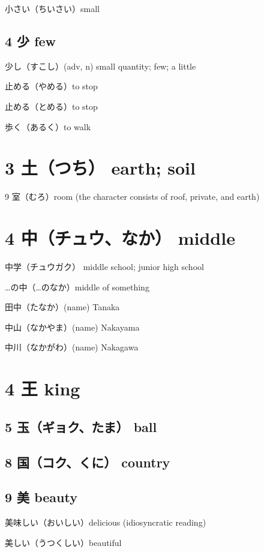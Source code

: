 小さい（ちいさい）small

\subsection{4 少 few}

少し（すこし）(adv, n) small quantity; few; a little

止める（やめる）to stop

止める（とめる）to stop

歩く（あるく）to walk

\section{3 土（つち） earth; soil}

9 室（むろ）room (the character consists of roof, private, and earth)

\section{4 中（チュウ、なか） middle}

中学（チュウガク） middle school; junior high school

…の中（…のなか）middle of something

田中（たなか）(name) Tanaka

中山（なかやま）(name) Nakayama

中川（なかがわ）(name) Nakagawa

\section{4 王 king}

\subsection{5 玉（ギョク、たま） ball}

\subsection{8 国（コク、くに） country}

\subsection{9 美 beauty}

美味しい（おいしい）delicious (idiosyncratic reading)

美しい（うつくしい）beautiful

